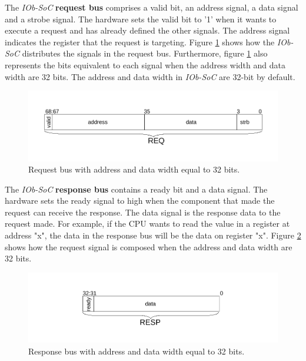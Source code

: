 The \textit{IOb-SoC} \textbf{request bus} comprises a valid bit, an address signal, a data signal and a strobe signal. The hardware sets the valid bit to '1' when it wants to execute a request and has already defined the other signals. The address signal indicates the register that the request is targeting. Figure \ref{fig:req_bus} shows how the \textit{IOb-SoC} distributes the signals in the request bus. Furthermore, figure \ref{fig:req_bus} also represents the bits equivalent to each signal when the address width and data width are 32 bits. The address and data width in \textit{IOb-SoC} are 32-bit by default.

\begin{figure}[!ht]
    \centering
    \includegraphics[width=\linewidth]{../images/req_bus.pdf}
    \caption{Request bus with address and data width equal to 32 bits.}
    \label{fig:req_bus}
\end{figure}

The \textit{IOb-SoC} \textbf{response bus} contains a ready bit and a data signal. The hardware sets the ready signal to high when the component that made the request can receive the response. The data signal is the response data to the request made. For example, if the CPU wants to read the value in a register at address "x", the data in the response bus will be the data on register "x". Figure \ref{fig:resp_bus} shows how the request signal is composed when the address and data width are 32 bits.

\begin{figure}[!ht]
    \centering
    \includegraphics[width=\linewidth]{../images/resp_bus.pdf}
    \caption{Response bus with address and data width equal to 32 bits.}
    \label{fig:resp_bus}
\end{figure}

